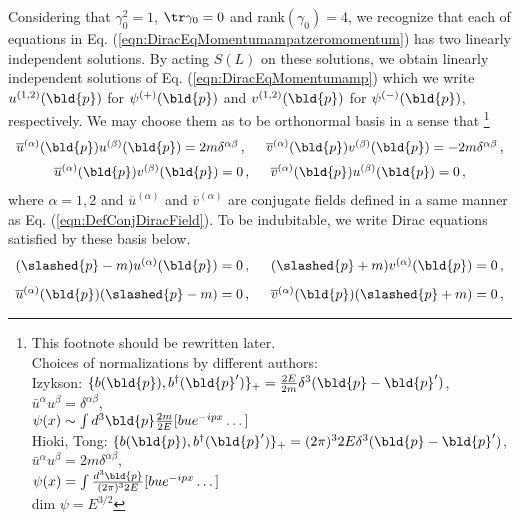 Considering that $\gamma_0^2 =1$, $\tr \gamma_0 = 0$ and rank$(\gamma_0) = 4$,
we recognize that each of equations in Eq. (\ref{eqn:DiracEqMomentumampatzeromomentum})
has  two  linearly independent solutions.
By acting $S(L)$ on 
these solutions, we obtain linearly independent solutions of Eq. (\ref{eqn:DiracEqMomentumamp})
which we write $u^{(1, 2)}(\bld{p})$ for $\psi^{(+)}(\bld{p})$ and $v^{(1,2)}(\bld{p})$
 for $\psi^{(-)}(\bld{p})$, respectively. 
We may choose them as to be orthonormal basis in a sense that
\footnote{%
This footnote should be rewritten later.\\
Choices of normalizations by different authors:\\
Izykson: $\{ b(\bld{p}),b^\dagger(\bld{p}') \}_+ = \frac{2E}{2m}\delta^3(\bld{p}-\bld{p}')$,
$\bar{u}^\alpha u^\beta = \delta^{\alpha \beta}$,\\
\hspace{20mm}$\psi(x) \sim \int d^3\bld{p}\frac{2m}{2E}[ b u e^{-ipx} \dots]$\\
Hioki, Tong: $\{ b(\bld{p}),b^\dagger(\bld{p}') \}_+ = (2\pi)^3 2E\delta^3(\bld{p}-\bld{p}')$,
$\bar{u}^\alpha u^\beta = 2m \delta^{\alpha \beta}$,\\
\hspace{20mm}$\psi(x) = \int \frac{d^3\bld{p}}{(2\pi)^32E}[ b u e^{-ipx} \dots]$\\
dim $\psi = E^{3/2}$
}%
\begin{eqnarray}
\begin{array}{c}
\overline{u}^{(\alpha)}(\bld{p})
u^{(\beta)}(\bld{p})
= 2m \delta^{\alpha \beta}\,,
\hspace{5mm}
\overline{v}^{(\alpha)}(\bld{p})
v^{(\beta)}(\bld{p})
= -2m \delta^{\alpha \beta}\,,
\vspace{2mm}
\\
\overline{u}^{(\alpha)}(\bld{p})
v^{(\beta)}(\bld{p})
= 0\,,
\hspace{5mm}
\overline{v}^{(\alpha)}(\bld{p})
u^{(\beta)}(\bld{p})
= 0 \,,
\end{array}
\label{eqn:DiracspinorNormalization}
\end{eqnarray}
where $\alpha = 1, 2$ and
$\overline{u}^{(\alpha)}$  and $\overline{v}^{(\alpha)}$ 
are conjugate fields defined in a same manner as Eq. (\ref{eqn:DefConjDiracField}).
To be indubitable, we write Dirac equations satisfied by these basis below.
\begin{eqnarray}
\begin{array}{l}
(\slashed{p} - m) u^{(\alpha)}(\bld{p}) = 0\,,
\hspace{5mm}
(\slashed{p} + m) v^{(\alpha)}(\bld{p}) = 0\,,
\vspace{3mm}
\\
\overline{u}^{(\alpha)}(\bld{p}) (\slashed{p} - m) = 0\,,
\hspace{5mm}
\overline{v}^{(\alpha)}(\bld{p}) (\slashed{p} + m) = 0\,,
\end{array}
\label{eqn:DiracEqDiracspinors}
\end{eqnarray}
